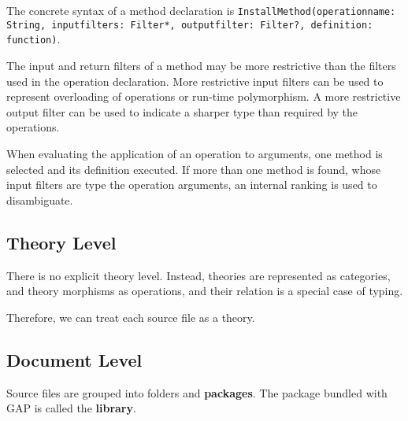 The concrete syntax of a method declaration is
\lstinline|InstallMethod(operationname: String, inputfilters: Filter*, outputfilter: Filter?, definition: function)|.

The input and return filters of a method may be more restrictive than the filters used in the operation declaration.
More restrictive input filters can be used to represent overloading of operations or run-time polymorphism.
A more restrictive output filter can be used to indicate a sharper type than required by the operations.

When evaluating the application of an operation to arguments, one method is selected and its definition executed.
If more than one method is found, whose input filters are type the operation arguments, an internal ranking is used to disambiguate.

\subsection{Theory Level}

There is no explicit theory level.
Instead, theories are represented as categories, and theory morphisms as operations, and their relation is a special case of typing.

Therefore, we can treat each source file as a theory.

\subsection{Document Level}

Source files are grouped into folders and \textbf{packages}.
The package bundled with GAP is called the \textbf{library}.